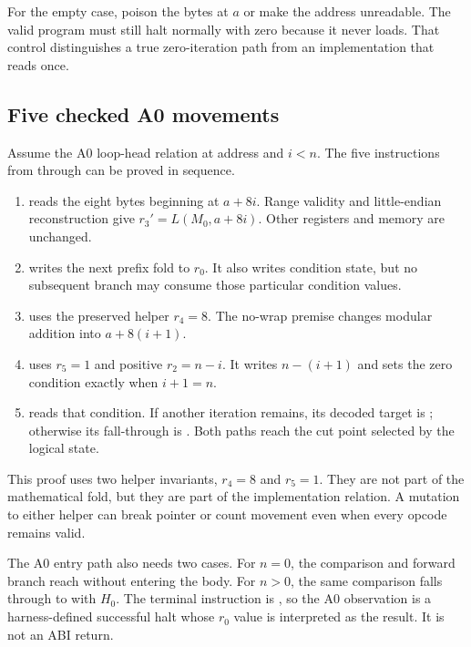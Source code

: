 For the empty case, poison the bytes at \(a\) or make the address unreadable.
The valid program must still halt normally with zero because it never loads.
That control distinguishes a true zero-iteration path from an implementation
that reads once.

\subsection{Five checked A0 movements}

Assume the A0 loop-head relation at address  and \(i<n\). The five
instructions from  through  can be proved in sequence.

\begin{enumerate}
\item {} reads the eight bytes beginning at \(a+8i\).
      Range validity and little-endian reconstruction give
      \(r_3'=L(M_0,a+8i)\). Other registers and memory are unchanged.
\item {} writes the next prefix fold to \(r_0\). It also
      writes condition state, but no subsequent branch may consume those
      particular condition values.
\item {} uses the preserved helper \(r_4=8\). The no-wrap
      premise changes modular addition into \(a+8(i+1)\).
\item {} uses \(r_5=1\) and positive \(r_2=n-i\). It writes
      \(n-(i+1)\) and sets the zero condition exactly when \(i+1=n\).
\item {} reads that condition. If another iteration
      remains, its decoded target is ; otherwise its fall-through is
      . Both paths reach the cut point selected by the logical state.
\end{enumerate}

This proof uses two helper invariants, \(r_4=8\) and \(r_5=1\). They are not
part of the mathematical fold, but they are part of the implementation
relation. A mutation to either helper can break pointer or count movement even
when every opcode remains valid.

The A0 entry path also needs two cases. For \(n=0\), the comparison and forward
branch reach  without entering the body. For \(n>0\), the same
comparison falls through to  with \(H_0\). The terminal instruction
is , so the A0 observation is a harness-defined successful halt
whose \(r_0\) value is interpreted as the result. It is not an ABI return.

